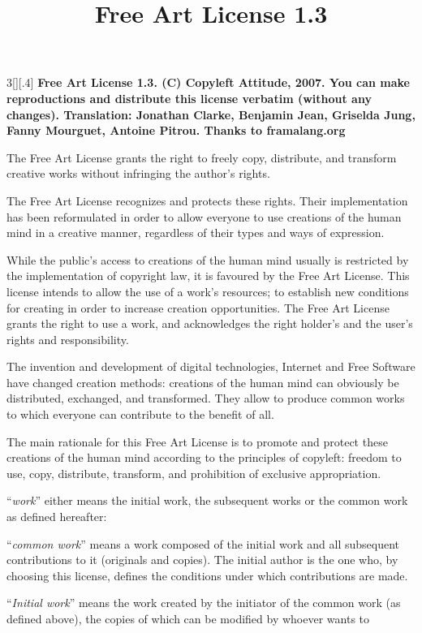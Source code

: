 \documentclass[8pt,a4paper]{article}
\title{Free Art License 1.3}
\newcommand\h[1]{\medskip{\scalefont{.91}#1}}
\begin{document}
%
%
\begin{multicols}{3}[][.4\paperwidth]%
{%
\textbf{%
Free Art License 1.3.
(C) Copyleft Attitude, 2007.
You can make reproductions and distribute this license verbatim (without any changes).
Translation: Jonathan Clarke, Benjamin Jean, Griselda Jung, Fanny Mourguet, Antoine Pitrou.
Thanks to framalang.org
}}

\bigskip

\h{PREAMBLE}

The Free Art License grants the right to freely copy, distribute, and transform creative works without infringing the author's rights.

The Free Art License recognizes and protects these rights. Their implementation has been reformulated in order to allow everyone to use creations of the human mind in a creative manner, regardless of their types and ways of expression.

While the public's access to creations of the human mind usually is restricted by the implementation of copyright law, it is favoured by the Free Art License. This license intends to allow the use of a work’s resources; to establish new conditions for creating in order to increase creation opportunities. The Free Art License grants the right to use a work, and acknowledges the right holder’s and the user’s rights and responsibility.

The invention and development of digital technologies, Internet and Free Software have changed creation methods: creations of the human mind can obviously be distributed, exchanged, and transformed. They allow to produce common works to which everyone can contribute to the benefit of all.

The main rationale for this Free Art License is to promote and protect these creations of the human mind according to the principles of copyleft: freedom to use, copy, distribute, transform, and prohibition of exclusive appropriation. 


\h{DEFINITIONS}

``\emph{work}'' either means the initial work, the subsequent works or the common work as defined hereafter:

``\emph{common work}'' means a work composed of the initial work and all subsequent contributions to it (originals and copies). The initial author is the one who, by choosing this license, defines the conditions under which contributions are made.

``\emph{Initial work}'' means the work created by the initiator of the common work (as defined above), the copies of which can be modified by whoever wants to


\end{multicols}
\end{document}

